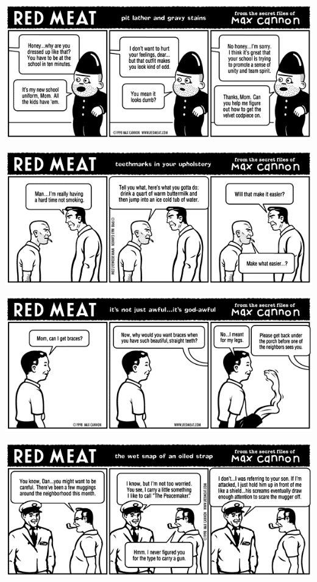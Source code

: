 \documentclass[a4paper,twoside,11pt]{article}
\begin{document}
\includegraphics[width=\textwidth]{redmeat_1998-04-13.png}



\includegraphics[width=\textwidth]{redmeat_1998-04-20.png}



\includegraphics[width=\textwidth]{redmeat_1998-04-27.png}



\includegraphics[width=\textwidth]{redmeat_1998-05-04.png}
\end{document}
